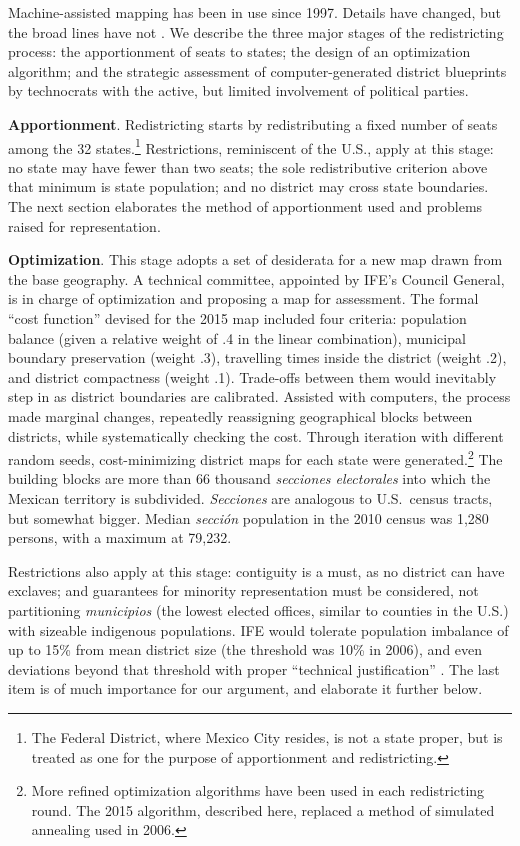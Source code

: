 \documentclass[letter,12pt]{article}
\begin{document}
Machine-assisted mapping has been in use since 1997. Details have changed, but the broad lines have not \citep{trelles.mtz.tesisItam.2007}. We describe the three major stages of the redistricting process: the apportionment of seats to states; the design of an optimization algorithm; and the strategic assessment of computer-generated district blueprints by technocrats with the active, but limited involvement of political parties. 

\textbf{Apportionment}. Redistricting starts by redistributing a fixed number of seats among the 32 states.\footnote{The Federal District, where Mexico City resides, is not a state proper, but is treated as one for the purpose of apportionment and redistricting.} Restrictions, reminiscent of the U.S., apply at this stage: no state may have fewer than two seats; the sole redistributive criterion above that minimum is state population; and no district may cross state boundaries. The next section elaborates the method of apportionment used and problems raised for representation. 

\textbf{Optimization}. This stage adopts a set of desiderata for a new map drawn from the base geography. A technical committee, appointed by IFE's Council General, is in charge of optimization and proposing a map for assessment. The formal ``cost function'' devised for the 2015 map included four criteria: population balance (given a relative weight of .4 in the linear combination), municipal boundary preservation (weight .3), travelling times inside the district (weight .2), and district compactness (weight .1). Trade-offs between them would inevitably step in as district boundaries are calibrated. Assisted with computers, the process made marginal changes, repeatedly reassigning geographical blocks between districts, while systematically checking the cost. Through iteration with different random seeds, cost-minimizing district maps for each state were generated.\footnote{More refined optimization algorithms have been used in each redistricting round. The 2015 algorithm, described here, replaced a method of simulated annealing used in 2006.} The building blocks are more than 66 thousand \emph{secciones electorales} into which the Mexican territory is subdivided. \emph{Secciones} are analogous to U.S.\ census tracts, but somewhat bigger. Median \emph{secci\'on} population in the 2010 census was 1,280 persons, with a maximum at 79,232. 

Restrictions also apply at this stage: contiguity is a must, as no district can have exclaves; and guarantees for minority representation must be considered, not partitioning \emph{municipios} (the lowest elected offices, similar to counties in the U.S.) with sizeable indigenous populations. IFE would tolerate population imbalance of up to 15\% from mean district size (the threshold was 10\% in 2006), and even deviations beyond that threshold with proper ``technical justification'' \citep{ife.acuerdoRedis2013}. The last item is of much importance for our argument, and elaborate it further below.
\end{document}
